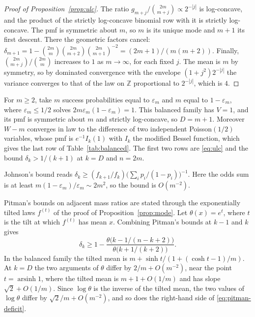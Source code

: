 \documentclass[ECP]{ejpecp}
\begin{document}
\begin{proof}[Proof of Proposition~\ref{prop:ulc}]
  The ratio $g_{m+j}/\binom{2m}{m+j}\propto2^{-|j|}$ is log-concave, and the
  product of the strictly log-concave binomial row with it is strictly
  log-concave. The pmf is symmetric about $m$, so $m$ is its unique mode and
  $m+1$ its first descent. There the geometric factors cancel:
  $\delta_{m+1}=1-\binom{2m}{m}\binom{2m}{m+2}\binom{2m}{m+1}^{-2}
  =(2m+1)/(m(m+2))$. Finally, $\binom{2m}{m+j}/\binom{2m}{m}$ increases to
  $1$ as $m\to\infty$, for each fixed $j$. The mean is $m$ by symmetry, so by dominated
  convergence with the envelope $(1+j^2)2^{-|j|}$ the variance converges to
  that of the law on $\mathbb Z$ proportional to $2^{-|j|}$, which is $4$.
\end{proof}

For $m\geq2$, take $m$ success probabilities equal to $\varepsilon_m$ and $m$
equal to $1-\varepsilon_m$, where $\varepsilon_m\leq1/2$ solves
$2m\varepsilon_m(1-\varepsilon_m)=1$. This balanced family has $V=1$, and its
pmf is symmetric about $m$ and strictly log-concave, so $D=m+1$. Moreover
$W-m$ converges in law to the difference of two independent Poisson$(1/2)$
variables, whose pmf is $e^{-1}I_k(1)$ with $I_k$ the modified Bessel
function, which gives the last row of Table~\ref{tab:balanced}. The first two
rows are \eqref{eq:ulc} and the bound $\delta_k>1/(k+1)$ at $k=D$ and $n=2m$.

Johnson's bound
\cite[Definition~1.2, Lemma~5.1, and Example~5.2(2)]{johnson2017discrete}
reads $\delta_k\geq(f_{k+1}/f_k)\bigl(\sum_ip_i/(1-p_i)\bigr)^{-1}$. Here the
odds sum is at least $m(1-\varepsilon_m)/\varepsilon_m\sim2m^2$, so the bound
is $O(m^{-2})$.

Pitman's bounds \cite[equation~(20)]{pitman1997} on adjacent mass ratios are
stated through the exponentially tilted laws $f^{(t)}$ of the proof of
Proposition~\ref{prop:mode}. Let $\theta(x)=e^t$, where $t$ is the tilt at
which $f^{(t)}$ has mean $x$. Combining Pitman's bounds at $k-1$ and $k$ gives
\begin{equation}\label{eq:pitman-deficit}
  \delta_k\geq1-\frac{\theta\bigl(k-1/(n-k+2)\bigr)}{\theta\bigl(k+1/(k+2)\bigr)}.
\end{equation}
In the balanced family the tilted mean is $m+\sinh t/(1+(\cosh t-1)/m)$. At
$k=D$ the two arguments of $\theta$ differ by $2/m+O(m^{-2})$, near the point
$t=\operatorname{arsinh}1$, where the tilted mean is $m+1+O(1/m)$ and has
slope $\sqrt2+O(1/m)$. Since $\log\theta$ is the inverse of the tilted mean,
the two values of $\log\theta$ differ by $\sqrt2/m+O(m^{-2})$, and so does the
right-hand side of \eqref{eq:pitman-deficit}.
\end{document}
